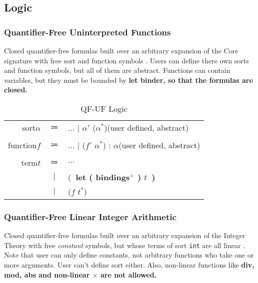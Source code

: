 \documentclass[11pt,letter]{article}
\theoremstyle{definition}
\begin{document}
\subsection{Logic}
\subsubsection{Quantifier-Free Uninterpreted Functions}
Closed quantifier-free formulas built over an arbitrary expansion of the Core signature with free sort and function symbols \cite{bs2010}. Users can define there own sorts and function symbols, but all of them are abstract. Functions can contain variables, but they must be bounded by \bf let \rm binder, so that the formulas are closed.

\begin{table}[h]
\begin{mdframed}
\centering
\begin{tabular}{r c l}
sort\qquad $\alpha$ & $\Coloneqq$ & $\ldots$ $\mid$ $\alpha'$ ($\alpha^*$)\rm\qquad(user defined, abstract)\\
\\
function\qquad $f$ & $\Coloneqq$ & $\ldots$ $\mid$ \rm ($f'$ $\alpha^*$) : $\alpha$\qquad(user defined, abstract)\\
\\
term\qquad $t$ & $\Coloneqq$ & $\ldots$ \\
& $\mid$ & (\bf\ let \rm ( bindings$^+$ ) $t$\ )\\
& $\mid$ & ($f$ $t^*$)
\end{tabular}
\end{mdframed}
\caption{QF-UF Logic}
\end{table}

\subsubsection{Quantifier-Free Linear Integer Arithmetic}
Closed quantifier-free formulas built over an arbitrary expansion of the
  Integer Theory with free {\it constant} symbols, but whose terms of sort {\tt int} 
  are all linear \cite{bs2010}. Note that user can only define constants, not arbitrary functions who take one or more arguments. User can't define sort either. Also, non-linear functions like \bf div\rm, \bf mod\rm, \bf abs \rm and non-linear $\times$ are not allowed.
\end{document}
